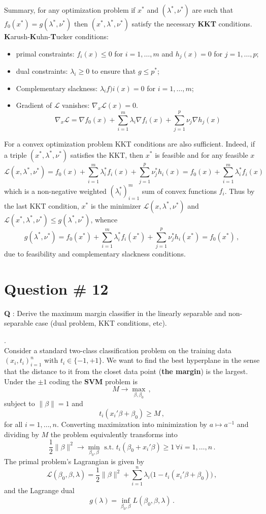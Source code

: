 \documentclass[a4paper]{article}
\newcommand{\Lcal}{\mathcal{L}}
\begin{document}
Summary, for any optimization problem if $x^*$ and $(\lambda^*,\nu^*)$ are such that
$f_0(x^*) = g(\lambda^*,\nu^*)$ then $(x^*,\lambda^*,\nu^*)$ satisfy the necessary
\textbf{KKT} conditions.
\textbf{K}arush-\textbf{K}uhn-\textbf{T}ucker conditions:
\begin{itemize}
	\item primal constraints: $f_i(x)\leq 0$ for $i=1,\ldots,m$ and $h_j(x) = 0$ for $j=1,\ldots,p$;
	\item dual constraints: $\lambda_i \geq 0$ to ensure that $g\leq p^*$;
	\item Complementary slackness: $\lambda_i f)i(x) = 0$ for $i=1,\ldots,m$;
	\item Gradient of $\Lcal$ vanishes: $\nabla_x \Lcal(x) = 0$.
	\[\nabla_x \Lcal = \nabla f_0(x) + \sum_{i=1}^m \lambda_i \nabla f_i(x) + \sum_{j=1}^p \nu_j \nabla h_j(x)\]
\end{itemize}

For a convex optimization problem KKT conditions are also sufficient. Indeed, if
a triple $(x^*,\lambda^*,\nu^*)$ satisfies the KKT, then $x^*$ is feasible and
for any feasible $x$
\[
\Lcal(x,\lambda^*,\nu^*)
= f_0(x) + \sum_{i=1}^m\lambda_i^* f_i(x) + \sum_{j=1}^p\nu_j^* h_i(x)
= f_0(x) + \sum_{i=1}^m\lambda_i^* f_i(x)
\]
which is a non-negative weighted $(\lambda_i^*)_{i=1}^m$ sum of convex functions
$f_i$. Thus by the last KKT condition, $x^*$ is the minimizer $\Lcal(x,\lambda^*,\nu^*)$
and $\Lcal(x^*,\lambda^*,\nu^*) \leq g(\lambda^*, \nu^*)$, whence
\[
g(\lambda^*,\nu^*)
= f_0(x^*) + \sum_{i=1}^m \lambda_i^* f_i(x^*) + \sum_{j=1}^p\nu_j^* h_i(x^*)
= f_0(x^*)\,,
\]
due to feasibility and complementary slackness conditions.

\clearpage

\section{Question \# 12} %
\label{sec:question_12}
\textbf{\large \textbf{Q}} : Derive the maximum margin classifier in the linearly
separable and non-separable case (dual problem, KKT conditions, etc).

 .\hfill\\
Consider a standard two-class classification problem on the training data
$(x_i,t_i)_{i=1}^n$ with $t_i\in\{-1,+1\}$. We want to find the best hyperplane
in the sense that the distance to it from the closet data point (\textbf{the margin})
is the largest. Under the $\pm1$ coding the \textbf{SVM} problem is
\[ M \to \max_{\beta, \beta_0}\,, \]
subject to $\|\beta\| = 1$ and
\[t_i(x_i'\beta + \beta_0) \geq M\,,\]
for all $i=1,\ldots,n$. Converting maximization into minimization by $a\mapsto a^{-1}$
and dividing by $M$ the problem equivalently transforms into
\[
\frac{1}{2}\|\beta\|^2 \to \min_{\beta_0,\beta}
\text{ s.t. }
t_i(\beta_0+x_i'\beta)\geq 1\,\forall i=1,\ldots,n\,.
\]
The primal problem's Lagrangian is given by
\[
\Lcal(\beta_0, \beta, \lambda)
= \frac{1}{2} \|\beta\|^2 + \sum_{i=1}^n \lambda_i \bigl( 1 - t_i(x_i'\beta+\beta_0) \bigr)\,,
\]
and the Lagrange dual
\[
g(\lambda) = \inf_{\beta_0,\beta} L(\beta_0, \beta, \lambda)\,.
\]
\end{document}
